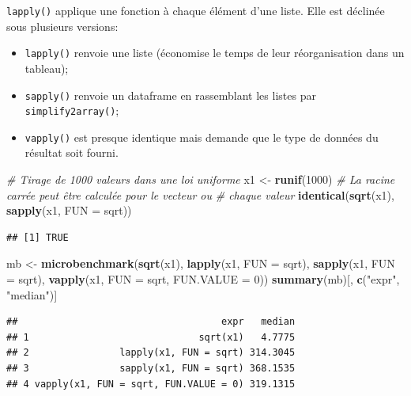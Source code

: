 \documentclass[
  12pt,
  french,
  a4paper,
  extrafontsizes,onecolumn,openright
  ]{memoir}
\newenvironment{Shaded}{\begin{snugshade}}{\end{snugshade}}
\newcommand{\CommentTok}[1]{\textcolor[rgb]{0.56,0.35,0.01}{\textit{#1}}}
\newcommand{\DataTypeTok}[1]{\textcolor[rgb]{0.13,0.29,0.53}{#1}}
\newcommand{\DecValTok}[1]{\textcolor[rgb]{0.00,0.00,0.81}{#1}}
\newcommand{\KeywordTok}[1]{\textcolor[rgb]{0.13,0.29,0.53}{\textbf{#1}}}
\newcommand{\NormalTok}[1]{#1}
\newcommand{\StringTok}[1]{\textcolor[rgb]{0.31,0.60,0.02}{#1}}
\providecommand{\tightlist}{%
  \setlength{\itemsep}{0pt}\setlength{\parskip}{0pt}}
\begin{document}
\texttt{lapply()} applique une fonction à chaque élément d'une liste.
Elle est déclinée sous plusieurs versions:

\begin{itemize}
\tightlist
\item
  \texttt{lapply()} renvoie une liste (économise le temps de leur réorganisation dans un tableau);
\item
  \texttt{sapply()} renvoie un dataframe en rassemblant les listes par \texttt{simplify2array()};
\item
  \texttt{vapply()} est presque identique mais demande que le type de données du résultat soit fourni.
\end{itemize}

\scriptsize

\begin{Shaded}
\begin{Highlighting}[]
\CommentTok{# Tirage de 1000 valeurs dans une loi uniforme}
\NormalTok{x1 <-}\StringTok{ }\KeywordTok{runif}\NormalTok{(}\DecValTok{1000}\NormalTok{)}
\CommentTok{# La racine carrée peut être calculée pour le vecteur ou}
\CommentTok{# chaque valeur}
\KeywordTok{identical}\NormalTok{(}\KeywordTok{sqrt}\NormalTok{(x1), }\KeywordTok{sapply}\NormalTok{(x1, }\DataTypeTok{FUN =}\NormalTok{ sqrt))}
\end{Highlighting}
\end{Shaded}

\begin{verbatim}
## [1] TRUE
\end{verbatim}

\begin{Shaded}
\begin{Highlighting}[]
\NormalTok{mb <-}\StringTok{ }\KeywordTok{microbenchmark}\NormalTok{(}\KeywordTok{sqrt}\NormalTok{(x1), }\KeywordTok{lapply}\NormalTok{(x1, }\DataTypeTok{FUN =}\NormalTok{ sqrt), }\KeywordTok{sapply}\NormalTok{(x1,}
    \DataTypeTok{FUN =}\NormalTok{ sqrt), }\KeywordTok{vapply}\NormalTok{(x1, }\DataTypeTok{FUN =}\NormalTok{ sqrt, }\DataTypeTok{FUN.VALUE =} \DecValTok{0}\NormalTok{))}
\KeywordTok{summary}\NormalTok{(mb)[, }\KeywordTok{c}\NormalTok{(}\StringTok{"expr"}\NormalTok{, }\StringTok{"median"}\NormalTok{)]}
\end{Highlighting}
\end{Shaded}

\begin{verbatim}
##                                    expr   median
## 1                              sqrt(x1)   4.7775
## 2                lapply(x1, FUN = sqrt) 314.3045
## 3                sapply(x1, FUN = sqrt) 368.1535
## 4 vapply(x1, FUN = sqrt, FUN.VALUE = 0) 319.1315
\end{verbatim}
\end{document}
